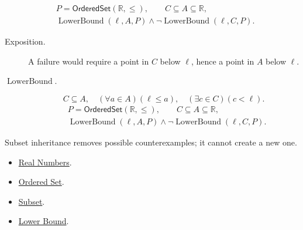 \begin{remark*}
\[
\begin{aligned}
&P=\mathsf{OrderedSet}(\mathbb{R},\leq),\qquad C\subseteq A\subseteq\mathbb{R},\\
&\operatorname{LowerBound}(\ell,A,P)\land\neg\operatorname{LowerBound}(\ell,C,P).
\end{aligned}
\]
\end{remark*}

\begin{remark*}
\begin{description}
\item[Exposition.]
A failure would require a point in $C$ below $\ell$, hence a point in $A$
below $\ell$.


  \item[\(\operatorname{LowerBound}.\)]
  \[
C\subseteq A,\quad (\forall a\in A)(\ell\leq a),\quad
(\exists c\in C)(c<\ell).
\]
\[
\begin{aligned}
&P=\mathsf{OrderedSet}(\mathbb{R},\leq),\qquad C\subseteq A\subseteq\mathbb{R},\\
&\operatorname{LowerBound}(\ell,A,P)\land\neg\operatorname{LowerBound}(\ell,C,P).
\end{aligned}
\]
\end{description}
\end{remark*}

\begin{remark*}[Interpretation]
Subset inheritance removes possible counterexamples; it cannot create a new
one.
\end{remark*}

\begin{dependencies}
\begin{itemize}
\item \hyperref[def:reals]{Real Numbers}.
\item \hyperref[def:ordered-set]{Ordered Set}.
\item \hyperref[def:subset]{Subset}.
\item \hyperref[def:real-lower-bound]{Lower Bound}.
\end{itemize}
\end{dependencies}


